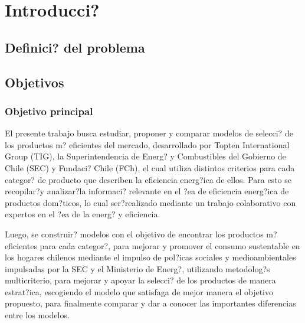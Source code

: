\chapter{Introducci?}
\label{cha:intro}

\section{Definici? del problema}
\label{sec:problematica}

\section{Objetivos}
\label{sec:objetivos}
\subsection{Objetivo principal}

El presente trabajo busca estudiar, proponer y comparar  modelos de selecci? de los productos m? eficientes del mercado, desarrollado por Topten International Group (TIG), la Superintendencia de Energ? y Combustibles del Gobierno de Chile (SEC) y Fundaci? Chile (FCh), el cual utiliza distintos criterios para cada categor? de producto que describen la eficiencia energ?ica de ellos. Para esto se recopilar?y analizar?la informaci? relevante en el ?ea de eficiencia energ?ica de productos dom?ticos, lo cual ser?realizado mediante un trabajo colaborativo con expertos en el ?ea de la energ? y eficiencia.

Luego, se construir? modelos con el objetivo de encontrar los productos m? eficientes para cada categor?, para mejorar y promover el consumo sustentable en los hogares chilenos mediante el impulso de pol?icas sociales y medioambientales impulsadas por la SEC y el Ministerio de Energ?, utilizando metodolog?s multicriterio, para mejorar y apoyar la selecci? de los productos de manera estrat?ica, escogiendo el modelo que satisfaga de mejor manera el objetivo propuesto, para finalmente comparar y dar a conocer las importantes diferencias entre los modelos.

